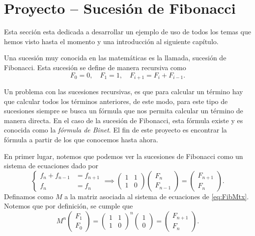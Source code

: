 \section{Proyecto -- Sucesión de Fibonacci}

Esta sección esta dedicada a desarrollar un ejemplo de uso de todos los temas que hemos visto hasta el momento y una introducción al siguiente capítulo.

Una sucesión muy conocida en las matemáticas es la llamada, sucesión de Fibonacci. Esta sucesión se define de manera recursiva como
\[
  F_0 = 0, \quad F_1 = 1, \quad F_{i+1} = F_i + F_{i-1}.
\]

Un problema con las sucesiones recursivas, es que para calcular un término hay que calcular todos los términos anteriores, de este modo, para este tipo de sucesiones siempre se busca un fórmula que nos permita calcular un término de manera directa. En el caso de la sucesión de Fibonacci, esta fórmula existe y es conocida como la \emph{fórmula de Binet}. El fin de este proyecto es encontrar la fórmula a partir de los que conocemos hasta ahora.

En primer lugar, notemos que podemos ver la sucesiones de Fibonacci como un sistema de ecuaciones dado por
\begin{equation}
  \left\{\begin{aligned}
    f_{n} + f_{n-1} &= f_{n+1} \\
    f_n             &= f_n
  \end{aligned}\right. 
    \implies
  \begin{pmatrix}
   1 & 1 \\ 1 & 0
  \end{pmatrix} \begin{pmatrix}  F_n \\ F_{n-1} \end{pmatrix}
    = \begin{pmatrix}  F_{n+1} \\ F_n \end{pmatrix}.
    \label{eq:FibMtx}
\end{equation}
Definamos como $M$ a la matriz asociada al sistema de ecuaciones de \eqref{eq:FibMtx}. Notemos que por definición, se cumple que
\[
  M^n \begin{pmatrix}  F_1 \\ F_0 \end{pmatrix} 
    = \begin{pmatrix} 1 & 1 \\ 1 & 0 \end{pmatrix}^n  \begin{pmatrix}  1 \\ 0 \end{pmatrix}
    = \begin{pmatrix}  F_{n+1} \\ F_n \end{pmatrix}.
\]

